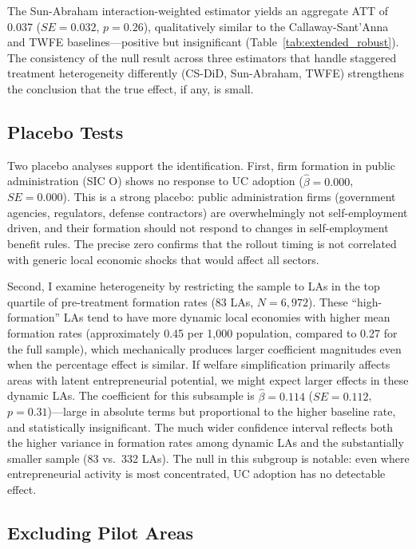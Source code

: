 \documentclass[12pt]{article}
\begin{document}
The Sun-Abraham interaction-weighted estimator \citep{sun2021estimating} yields an aggregate ATT of 0.037 ($SE = 0.032$, $p = 0.26$), qualitatively similar to the Callaway-Sant'Anna and TWFE baselines---positive but insignificant (Table~\ref{tab:extended_robust}). The consistency of the null result across three estimators that handle staggered treatment heterogeneity differently (CS-DiD, Sun-Abraham, TWFE) strengthens the conclusion that the true effect, if any, is small.

\subsection{Placebo Tests}

Two placebo analyses support the identification. First, firm formation in public administration (SIC O) shows no response to UC adoption ($\hat{\beta} = 0.000$, $SE = 0.000$). This is a strong placebo: public administration firms (government agencies, regulators, defense contractors) are overwhelmingly not self-employment driven, and their formation should not respond to changes in self-employment benefit rules. The precise zero confirms that the rollout timing is not correlated with generic local economic shocks that would affect all sectors.

Second, I examine heterogeneity by restricting the sample to LAs in the top quartile of pre-treatment formation rates (83 LAs, $N = 6{,}972$). These ``high-formation'' LAs tend to have more dynamic local economies with higher mean formation rates (approximately 0.45 per 1,000 population, compared to 0.27 for the full sample), which mechanically produces larger coefficient magnitudes even when the percentage effect is similar. If welfare simplification primarily affects areas with latent entrepreneurial potential, we might expect larger effects in these dynamic LAs. The coefficient for this subsample is $\hat{\beta} = 0.114$ ($SE = 0.112$, $p = 0.31$)---large in absolute terms but proportional to the higher baseline rate, and statistically insignificant. The much wider confidence interval reflects both the higher variance in formation rates among dynamic LAs and the substantially smaller sample (83 vs.\ 332 LAs). The null in this subgroup is notable: even where entrepreneurial activity is most concentrated, UC adoption has no detectable effect.

\subsection{Excluding Pilot Areas}
\end{document}
